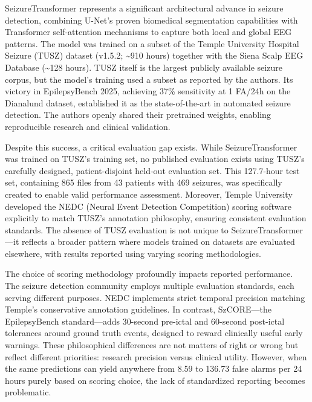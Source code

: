 \documentclass[
  10pt,
]{article}
\begin{document}
SeizureTransformer represents a significant architectural advance in
seizure detection, combining U-Net's proven biomedical segmentation
capabilities with Transformer self-attention mechanisms to capture both
local and global EEG patterns. The model was trained on a subset of the
Temple University Hospital Seizure (TUSZ) dataset (v1.5.2;
\textasciitilde910 hours) together with the Siena Scalp EEG Database
(\textasciitilde128 hours). TUSZ itself is the largest publicly
available seizure corpus, but the model's training used a subset as
reported by the authors. Its victory in EpilepsyBench 2025, achieving
37\% sensitivity at 1 FA/24h on the Dianalund dataset, established it as
the state-of-the-art in automated seizure detection. The authors openly
shared their pretrained weights, enabling reproducible research and
clinical validation.

Despite this success, a critical evaluation gap exists. While
SeizureTransformer was trained on TUSZ's training set, no published
evaluation exists using TUSZ's carefully designed, patient-disjoint
held-out evaluation set. This 127.7-hour test set, containing 865 files
from 43 patients with 469 seizures, was specifically created to enable
valid performance assessment. Moreover, Temple University developed the
NEDC (Neural Event Detection Competition) scoring software explicitly to
match TUSZ's annotation philosophy, ensuring consistent evaluation
standards. The absence of TUSZ evaluation is not unique to
SeizureTransformer---it reflects a broader pattern where models trained
on datasets are evaluated elsewhere, with results reported using varying
scoring methodologies.

The choice of scoring methodology profoundly impacts reported
performance. The seizure detection community employs multiple evaluation
standards, each serving different purposes. NEDC implements strict
temporal precision matching Temple's conservative annotation guidelines.
In contrast, SzCORE---the EpilepsyBench standard---adds 30-second
pre-ictal and 60-second post-ictal tolerances around ground truth
events, designed to reward clinically useful early warnings. These
philosophical differences are not matters of right or wrong but reflect
different priorities: research precision versus clinical utility.
However, when the same predictions can yield anywhere from 8.59 to
136.73 false alarms per 24 hours purely based on scoring choice, the
lack of standardized reporting becomes problematic.
\end{document}
